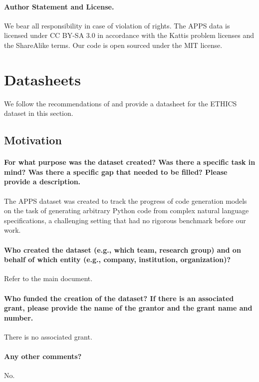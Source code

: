 \documentclass{article}
\begin{document}
\paragraph{Author Statement and License.}
We bear all responsibility in case of violation of rights. The APPS data is licensed under CC BY-SA 3.0 in accordance with the Kattis problem licenses and the ShareAlike terms. Our code is open sourced under the MIT license.

\section{Datasheets}
We follow the recommendations of \citet{gebru2018datasheets} and provide a datasheet for the ETHICS dataset in this section.

\subsection{Motivation}

\paragraph{For what purpose was the dataset created? Was there a specific task
in mind? Was there a specific gap that needed to be filled? Please provide
a description.} 
The APPS dataset was created to track the progress of code generation models on the task of generating arbitrary Python code from complex natural language specifications, a challenging setting that had no rigorous benchmark before our work.

\paragraph{Who created the dataset (e.g., which team, research group) and on
behalf of which entity (e.g., company, institution, organization)?}
Refer to the main document.

\paragraph{Who funded the creation of the dataset? If there is an associated
grant, please provide the name of the grantor and the grant name and
number.}
There is no associated grant.

\paragraph{Any other comments?}
No.
\end{document}
